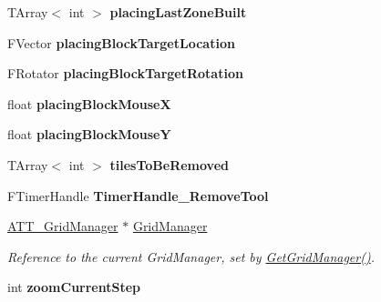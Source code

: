 \begin{DoxyCompactItemize}
T\+Array$<$ int $>$ {\bfseries placing\+Last\+Zone\+Built}
\item 
\mbox{\label{class_a_t_t___player_grid_camera_aa24c90ace03ae96c39eb6c52c09bd8a5}} 
F\+Vector {\bfseries placing\+Block\+Target\+Location}
\item 
\mbox{\label{class_a_t_t___player_grid_camera_ab798a1bbd33b0ad745ee10631408e1f9}} 
F\+Rotator {\bfseries placing\+Block\+Target\+Rotation}
\item 
\mbox{\label{class_a_t_t___player_grid_camera_ab78c2b39ef84808df0b83bdff696d516}} 
float {\bfseries placing\+Block\+MouseX}
\item 
\mbox{\label{class_a_t_t___player_grid_camera_a3098404ebef517be33b5a0d80648d2a4}} 
float {\bfseries placing\+Block\+MouseY}
\item 
\mbox{\label{class_a_t_t___player_grid_camera_a1b6d0bf24eb7261ed3beefab824a15f3}} 
T\+Array$<$ int $>$ {\bfseries tiles\+To\+Be\+Removed}
\item 
\mbox{\label{class_a_t_t___player_grid_camera_a563d7f0bbe94f8ac7d3fb68a280a8a56}} 
F\+Timer\+Handle {\bfseries Timer\+Handle\+\_\+\+Remove\+Tool}
\item 
\mbox{\hyperlink{class_a_t_t___grid_manager}{A\+T\+T\+\_\+\+Grid\+Manager}} $\ast$ \mbox{\hyperlink{class_a_t_t___player_grid_camera_a7fbaa573742ce09a00fde7506b3087ce}{Grid\+Manager}}
\begin{DoxyCompactList}\small\item\em Reference to the current Grid\+Manager, set by \mbox{\hyperlink{class_a_t_t___player_grid_camera_ae4c11bb7a68a06a9f95e445db9ccc69f}{Get\+Grid\+Manager()}}. \end{DoxyCompactList}\item 
\mbox{\label{class_a_t_t___player_grid_camera_a90f7795d356b6fb9c3c7c070da75f5c9}} 
int {\bfseries zoom\+Current\+Step}
\item 
\mbox{\label{class_a_t_t___player_grid_camera_aa7bb5b6132ddd2f7e870fe4a82419a6e}} 

\end{DoxyCompactItemize}
